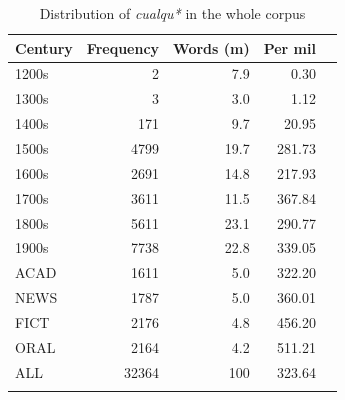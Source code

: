 \begin{table}
\caption{Distribution of \textit{cualqu*} in the whole corpus}
\label{tab:extracted2}
\begin{tabular}{lrrrr}
\lsptoprule
Century &  Frequency &  Words (m) &  Per mil\\
\midrule
{1200s} & 2 & 7.9 & 0.30 \\
{1300s} & 3 & 3.0 & 1.12 \\
{1400s} & 171 & 9.7 & 20.95 \\
{1500s} & 4799 & 19.7 & 281.73 \\
{1600s} & 2691 & 14.8 & 217.93 \\
{1700s} & 3611 & 11.5 & 367.84 \\
{1800s} & 5611 & 23.1 & 290.77 \\
{1900s} & 7738 & 22.8 & 339.05 \\
\tablevspace
{ACAD} & 1611 & 5.0 & 322.20 \\
{NEWS} & 1787 & 5.0 & 360.01 \\
{FICT} & 2176 & 4.8 & 456.20 \\
{ORAL} & 2164 &  4.2 & 511.21 \\
\midrule
{ALL} & 32364 & 100 & 323.64 \\
\lspbottomrule
\end{tabular}
\end{table}


